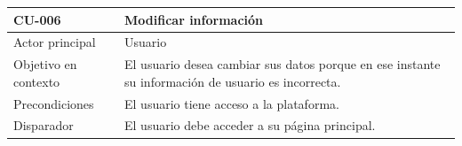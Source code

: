 
\begin{table}[htpb]
\centering
\begin{tabularx}{\textwidth}{|X|X|}
\hline
\rowcolor[gray]{0.9}\textbf{CU-006}                            & \textbf{Modificar información}                                                                                                                                                                                                                                                                                                                                                                                                                                                                                \\ \hline
Actor principal                   & Usuario                                                                                                                                                                                                                                                                                                                                                                                                                                                                                              \\ \hline
Objetivo en contexto              & El usuario desea cambiar sus datos porque en ese instante su información de usuario es incorrecta.                                                                                                                                                                                                                                                                                                                                                                                                   \\ \hline
Precondiciones                    & El usuario tiene acceso a la plataforma.                                                                                                                                                                                                                                                                                                                                                                                                                                                             \\ \hline
Disparador                        & El usuario debe acceder a su página principal.                                                                                                                                                                                                                                                                                                                                                                                                                                                       \\ \hline

\end{tabularx}
\end{table}
